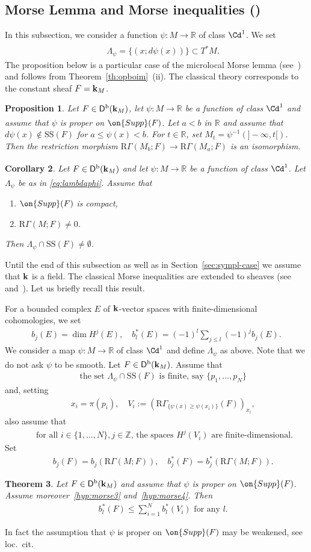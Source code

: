 \documentclass[12pt,leqno]{article}
\newtheorem{theorem}{Theorem}[section]
\newtheorem{proposition}[theorem]{Proposition}
\newtheorem{corollary}[theorem]{Corollary}
\theoremstyle{definition}
\newcommand{\R}{{\mathbb{R}}}
\newcommand{\Z}{{\mathbb{Z}}}
\newcommand{\cor}{{\bf k}}
\renewcommand{\to}[1][]{\xrightarrow[]{#1}}
\newcommand{\rsect}{\mathrm{R}\Gamma}
\newcommand{\opb}[1]{#1^{-1}}
\newcommand{\eqdot}{\mathbin{:=}}
\newcommand{\cl}{\colon}
\newcommand{\bnum}{\begin{enumerate}[{\rm(i)}]}
\newcommand{\enum}{\end{enumerate}}
\newcommand{\eq}{\begin{eqnarray}}
\newcommand{\eneq}{\end{eqnarray}}
\newcommand{\eqn}{\begin{eqnarray*}}
\newcommand{\eneqn}{\end{eqnarray*}}
\newcommand{\Supp}{\on{Supp}}
\newcommand{\Der}[1][]{\mathsf{D}^{#1}}
\newcommand{\Derb}{\Der[\mathrm{b}]}
\newcommand{\SSi}{\mathrm{SS}}
\numberwithin{equation}{section}
\begin{document}
\subsection{Morse Lemma and Morse inequalities (\cite[\S 5.4]{KS90})}
In this subsection, we consider a function $\psi\cl M\to\R$ of class $\Cd^1$. We set
\eq\label{eq:lambdaphi}
&& \Lambda_\psi=\{(x;d\psi(x))\}\subset T^*M. 
\eneq
The proposition below is a particular case of the microlocal Morse lemma
(see~\cite[Cor.~5.4.19]{KS90}) and follows from 
Theorem~\ref{th:opboim}~(ii).
The classical theory
corresponds to the constant sheaf $F=\cor_M$.
\begin{proposition}\label{prop:Morse}
Let $F\in\Derb(\cor_M)$, let $\psi\cl M\to\R$ be a function of class $\Cd^1$ and assume that $\psi$
is proper on $\Supp(F)$. Let $a<b$ in $\R$
and assume that $d\psi(x)\notin\SSi(F)$ for $a\leq \psi(x)<b$. 
For $t\in\R$, set $M_t=\opb{\psi}(]-\infty,t[)$. Then the
restriction morphism  $\rsect(M_b;F)\to\rsect(M_a;F)$ is an isomorphism.
\end{proposition}
\begin{corollary}\label{cor:Morse1}
Let $F\in\Derb(\cor_M)$ and let $\psi\cl M\to\R$ be a function of class $\Cd^1$.
Let $\Lambda_\psi$ be as in {\rm \eqref{eq:lambdaphi}}. Assume that 
\bnum
\item
$\Supp(F)$ is compact,
\item
$\rsect(M;F)\not=0$.
\enum
Then $\Lambda_\psi\cap\SSi(F)\not=\emptyset$.
\end{corollary}
Until the end of  this subsection as well as in Section~\ref{sec:sympl-case} we assume that
$\cor$ is a field.
The classical Morse inequalities are extended to sheaves
(see~\cite{ST92} and~\cite[Prop.~5.4.20]{KS90}).
Let us briefly recall this result.

For  a bounded complex $E$ of $\cor$-vector spaces 
with finite-dimensional cohomologies, we set 
\eqn
b_j(E)=\dim H^j(E),\quad b^*_l(E)=(-1)^l\sum_{j\leq l}(-1)^jb_j(E).
\eneqn
We consider a map $\psi\cl M \to \R$ of class $\Cd^1$ and define
$\Lambda_\psi$ as above. Note that we do not ask $\psi$ to be smooth. 
Let $F\in\Derb(\cor_M)$. Assume that 
\eq\label{hyp:morse3}
&&\mbox{the set }\Lambda_\psi\cap\SSi(F)\mbox{ is finite, say }\{p_1,\dots,p_N\}
\eneq
and, setting
\eq\label{eq:Vi}
&&x_i=\pi(p_i),\quad V_i\eqdot (\rsect_{\{\psi(x)\geq\psi(x_i)\}}(F))_{x_i},
\eneq
also assume that
\eq\label{hyp:morse4}
&&\mbox{ for all $i\in\{1,\dots,N\},j\in\Z$, the spaces $H^j(V_i)$ are
finite-dimensional.} 
\eneq
Set
\eqn
&&b_j(F)=b_j(\rsect(M;F)),\quad  b^*_j(F)=b^*_j(\rsect(M;F)).
\eneqn
\begin{theorem}\label{th:Morse1}
Let $F\in\Derb(\cor_M)$ and assume that $\psi$ is proper on $\Supp(F)$. 
Assume moreover~\eqref{hyp:morse3} and~\eqref{hyp:morse4}. Then
\eq\label{eq:morseineq1}
&&b_l^*(F)\leq \sum_{i=1}^N b^*_l(V_i)\mbox{ for any $l$}.
\eneq
\end{theorem}
In fact the assumption that $\psi$ is proper on $\Supp(F)$ may be weakened, see loc.\ cit.
\end{document}
